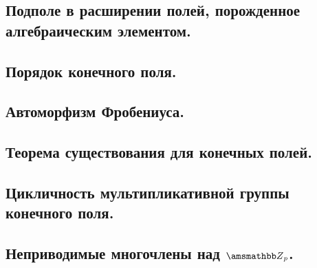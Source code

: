 \mysection
\subsection{Подполе в расширении полей, порожденное алгебраическим элементом.}

\newpage
\mysection
\subsection{Порядок конечного поля.}
\subsection{Автоморфизм Фробениуса.}


\newpage
\mysection
\subsection{Теорема существования для конечных полей.}


\newpage
\mysection
\subsection{Цикличность мультипликативной группы конечного поля.}
\subsection{Неприводимые многочлены над \texorpdfstring{$\ZZ_p$.}{Lg}}


